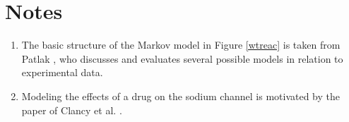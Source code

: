 

\section{Notes}

\begin{enumerate}
\item The basic structure of the Markov model in Figure \ref{wtreac} is taken 
from Patlak \cite{Patlak1991}, who discusses and evaluates several possible models in relation to experimental data.

\item Modeling the effects of a drug on the sodium channel is motivated by
the paper of Clancy et al. \cite{Clancy2007}.


\end{enumerate}



%
%
%
